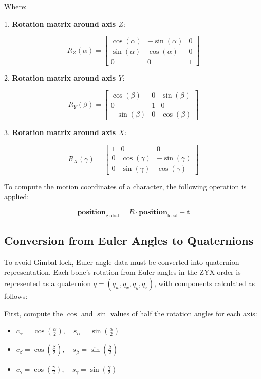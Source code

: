 Where:

1. \textbf{Rotation matrix around axis \(Z\)}:

\[
R_Z(\alpha) = 
\begin{bmatrix}
	\cos(\alpha) & -\sin(\alpha) & 0 \\
	\sin(\alpha) & \cos(\alpha) & 0 \\
	0 & 0 & 1
\end{bmatrix}
\]

2. \textbf{Rotation matrix around axis \(Y\)}:

\[
R_Y(\beta) = 
\begin{bmatrix}
	\cos(\beta) & 0 & \sin(\beta) \\
	0 & 1 & 0 \\
	-\sin(\beta) & 0 & \cos(\beta)
\end{bmatrix}
\]

3. \textbf{Rotation matrix around axis \(X\)}:

\[
R_X(\gamma) = 
\begin{bmatrix}
	1 & 0 & 0 \\
	0 & \cos(\gamma) & -\sin(\gamma) \\
	0 & \sin(\gamma) & \cos(\gamma)
\end{bmatrix}
\]

To compute the motion coordinates of a character, the following operation is applied:

\begin{equation}
	\mathbf{position}_{\text{global}} = R \cdot \mathbf{position}_{\text{local}} + \mathbf{t}
\end{equation}


\subsection{Conversion from Euler Angles to Quaternions}
\label{appendix:BVHQuaternion}

To avoid Gimbal lock, Euler angle data must be converted into quaternion representation. Each bone's rotation from Euler angles in the ZYX order is represented as a quaternion $q = (q_w, q_x, q_y, q_z)$, with components calculated as follows:

First, compute the $\cos$ and $\sin$ values of half the rotation angles for each axis:

\begin{itemize}
	\item $c_{\alpha} = \cos\left(\frac{\alpha}{2}\right), \quad s_{\alpha} = \sin\left(\frac{\alpha}{2}\right)$
	\item $c_{\beta} = \cos\left(\frac{\beta}{2}\right), \quad s_{\beta} = \sin\left(\frac{\beta}{2}\right)$
	\item $c_{\gamma} = \cos\left(\frac{\gamma}{2}\right), \quad s_{\gamma} = \sin\left(\frac{\gamma}{2}\right)$
\end{itemize}

